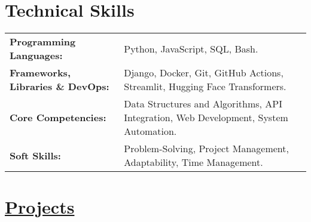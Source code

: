 \documentclass[a4paper,10pt]{article}
\begin{document}
\section{Technical Skills}
\vspace{2.5pt}
\begin{tabularx}{\linewidth}{@{} l X @{}}
    \textbf{Programming Languages:} & Python, JavaScript, SQL, Bash. \\
    \vspace{2.5pt}
    \textbf{Frameworks, Libraries \& DevOps:} & Django, Docker, Git, GitHub Actions, Streamlit, Hugging Face Transformers. \\
    \vspace{2.5pt}
    \textbf{Core Competencies:} & Data Structures and Algorithms, API Integration, Web Development, System Automation. \\
    \vspace{2.5pt}
    \textbf{Soft Skills:} & Problem-Solving, Project Management, Adaptability, Time Management. \\
\end{tabularx}

\vspace{3pt}

\newcommand{\projectentry}[5]{%
    \noindent\vspace{5pt}
    \textcolor{myblue}{\textbf{\href{#2}{#1}}} \textcolor{mydarkblue}{\href{#3}{\faLink}} %
    \hfill {\small\textbf{\textcolor{mylightpurple}{#5}}} \\ \vspace{-10pt} %

    \begin{itemize}[left=0pt, label=--, nosep]
        \item \vspace{-10pt}\textbf{Overview:} #4
    \end{itemize}
    \vspace{0pt} %
}


\vspace{-3pt}
\section{\href{https://github.com/deekshith0509?tab=repositories}{Projects}}
\end{document}
